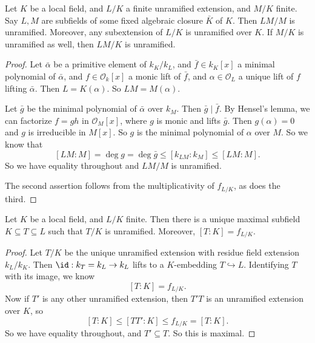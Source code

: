 \documentclass[a4paper]{article}
\begin{document}
\begin{prop}
  Let $K$ be a local field, and $L/K$ a finite unramified extension, and $M/K$ finite. Say $L, M$ are subfields of some fixed algebraic closure $\bar{K}$ of $K$. Then $LM/M$ is unramified. Moreover, any subextension of $L/K$ is unramified over $K$. If $M/K$ is unramified as well, then $LM/K$ is unramified.
\end{prop}

\begin{proof}
  Let $\bar{\alpha}$ be a primitive element of $k_K/k_L$, and $\bar{f} \in k_K[x]$ a minimal polynomial of $\bar{\alpha}$, and $f \in \mathcal{O}_k[x]$ a monic lift of $\bar{f}$, and $\alpha \in \mathcal{O}_L$ a unique lift of $f$ lifting $\bar{\alpha}$. Then $L = K(\alpha)$. So $LM = M(\alpha)$.

  Let $\bar{g}$ be the minimal polynomial of $\bar{\alpha}$ over $k_M$. Then $\bar{g} \mid \bar{f}$. By Hensel's lemma, we can factorize $f = gh$ in $\mathcal{O}_M[x]$, where $g$ is monic and lifts $\bar{g}$. Then $g(\alpha) = 0$ and $g$ is irreducible in $M[x]$. So $g$ is the minimal polynomial of $\alpha$ over $M$. So we know that
  \[
    [LM:M] = \deg g = \deg \bar{g} \leq [k_{LM}:k_M] \leq [LM:M].
  \]
  So we have equality throughout and $LM/M$ is unramified.

  The second assertion follows from the multiplicativity of $f_{L/K}$, as does the third.
\end{proof}

\begin{cor}
  Let $K$ be a local field, and $L/K$ finite. Then there is a unique maximal subfield $K \subseteq T \subseteq L$ such that $T/K$ is unramified. Moreover, $[T:K] = f_{L/K}$.
\end{cor}

\begin{proof}
  Let $T/K$ be the unique unramified extension with residue field extension $k_L/k_K$. Then $\id: k_T = k_L \to k_L$ lifts to a $K$-embedding $T \hookrightarrow L$. Identifying $T$ with its image, we know
  \[
    [T:K] = f_{L/K}.
  \]
  Now if $T'$ is any other unramified extension, then $T'T$ is an unramified extension over $K$, so
  \[
    [T:K] \leq [TT':K] \leq f_{L/K} = [T:K].
  \]
  So we have equality throughout, and $T' \subseteq T$. So this is maximal.
\end{proof}
\end{document}
